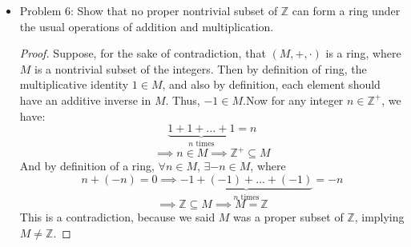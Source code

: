 \documentclass[hidelinks,12pt]{article}
\newcommand{\Z}{\mathbb{Z}}
\begin{document}
\begin{itemize}
\begin{enumerate}[label=(\alph*)]
\begin{proof}
        \end{proof}
        \item $E=\{m+nu\}$\begin{proof}
        \end{proof}
        \item $F=\{\}$\begin{proof}
        \end{proof}
    \end{enumerate}
    \item Problem 6: Show that no proper nontrivial subset of $\Z$ can form a ring under the usual operations of addition and multiplication.\begin{proof}Suppose, for the sake of contradiction, that $(M,+,\cdot)$ is a ring, where $M$ is a nontrivial subset of the integers. Then by definition of ring, the multiplicative identity $1\in M$, and also by definition, each element should have an additive inverse in $M$. Thus, $-1\in M$.\newline Now for any integer $n\in\Z^+$, we have:$$\underbrace{1+1+\dots+1}_{\text{$n$ times}}=n$$ $$\implies n\in M\implies \Z^+\subseteq M$$ And by definition of a ring, $\forall n\in M$, $\exists -n\in M$, where $$n+(-n)=0\implies\underbrace{-1+(-1)+\dots+(-1)}_{\text{$n$ times}}=-n$$ $$\implies\Z\subseteq M\implies M=\Z$$ This is a contradiction, because we said $M$ was a proper subset of $\Z$, implying $M\neq\Z$.
    \end{proof}
\end{itemize}
\end{document}
